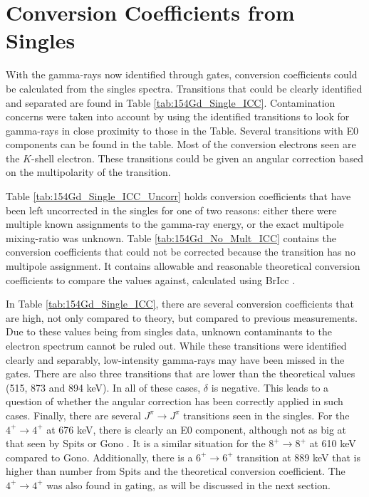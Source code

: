 





\section{Conversion Coefficients from Singles}
\label{sec:154_Conv_Singles}

With the gamma-rays now identified through gates, conversion coefficients could be calculated from the singles spectra. Transitions that could be clearly identified and separated are found in Table \ref{tab:154Gd_Single_ICC}. Contamination concerns were taken into account by using the identified transitions to look for gamma-rays in close proximity to those in the Table. Several transitions with E0 components can be found in the table. Most of the conversion electrons seen are the $K$-shell electron. These transitions could be given an angular correction based on the multipolarity of the transition.

Table \ref{tab:154Gd_Single_ICC_Uncorr} holds conversion coefficients that have been left uncorrected in the singles for one of two reasons: either there were multiple known assignments to the gamma-ray energy, or the exact multipole mixing-ratio was unknown. Table \ref{tab:154Gd_No_Mult_ICC} contains the conversion coefficients that could not be corrected because the transition has no multipole assignment. It contains allowable and reasonable theoretical conversion coefficients to compare the values against, calculated using BrIcc \cite{kibedi08:_BRICC}.

\afterpage{\clearpage}

\afterpage{\clearpage}

\afterpage{\clearpage}   

In Table \ref{tab:154Gd_Single_ICC}, there are several conversion coefficients that are high, not only compared to theory, but compared to previous measurements. Due to these values being from singles data, unknown contaminants to the electron spectrum cannot be ruled out. While these transitions were identified clearly and separably, low-intensity gamma-rays may have been missed in the gates. There are also three transitions that are lower than the theoretical values (515, 873 and 894 keV). In all of these cases, $\delta$ is negative. This leads to a question of whether the angular correction has been correctly applied in such cases. Finally, there are several $J^{\pi}\rightarrow J^{\pi}$ transitions seen in the singles. For the $4^+\rightarrow4^+$ at 676 keV, there is clearly an E0 component, although not as big at that seen by Spits \cite{spits96:_154gd} or Gono \cite{gono74:_154gd_e0}. It is a similar situation for the $8^+\rightarrow8^+$ at 610 keV compared to Gono. Additionally, there is a $6^+\rightarrow6^+$ transition at 889 keV that is higher than number from Spits and the theoretical conversion coefficient. The $4^+\rightarrow4^+$ was also found in gating, as will be discussed in the next section.

